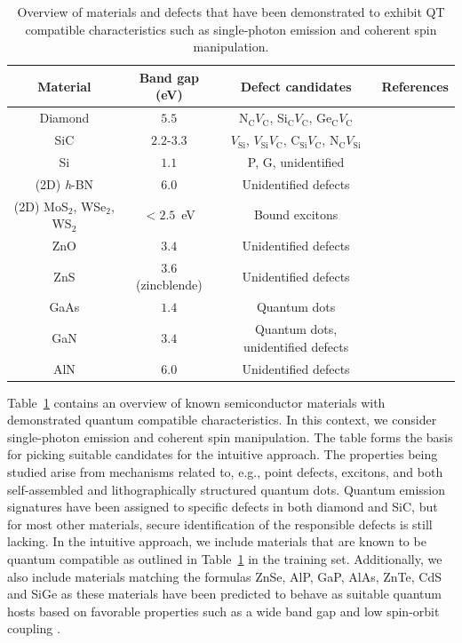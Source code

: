 \documentclass[superscriptaddress,unsortedaddress,
 amsmath,amssymb,
 aps,
]{revtex4-2}
\begin{document}
\begin{table}[b]
    \centering 
    \caption{Overview of materials and defects that have been demonstrated to exhibit QT compatible characteristics such as single-photon emission and coherent spin manipulation.}
    \begin{tabular}{c|c|c|c}
    Material & Band gap (eV) & Defect candidates & References \\
    \hline
    Diamond  & $5.5$  & N$_\mathrm{C}V_\mathrm{C}$, Si$_\mathrm{C}V_\mathrm{C}$, Ge$_\mathrm{C}V_\mathrm{C}$ & \cite{Taylor2008,Balasubramanian_2009,Barclay2011,Gordon2013,Rogers_2014,Bhaskar_2018} \\ 
    SiC & $2.2$-$3.3$ & $V_\mathrm{Si}$, $V_\mathrm{Si}V_\mathrm{C}$, C$_\mathrm{Si}V_\mathrm{C}$, N$_\mathrm{C}V_\mathrm{Si}$ & \cite{Widmann2014,Christle_2015,Castelletto_2014,Zargaleh_2018}  \cite{Weber2010, Son2020, Falk2013} \\ 
    Si & $1.1$ & P, G, unidentified & \cite{Muhonen_2014,Durand_2020,Redjem2020} \\ 
    (2D) \textit{h}-BN & $6.0$ & Unidentified defects & \cite{Tran_2016,Tran_2016b,Hayee_2020} \\ 
    (2D) MoS$_2$, WSe$_2$, WS$_2$ & $<2.5$~eV & Bound excitons & \cite{Toth2019} \\
    ZnO & $3.4$ & Unidentified defects & \cite{Morfa2012} \\ 
    ZnS & $3.6$ (zincblende) & Unidentified defects & \cite{Stewart2019} \\ 
    GaAs & $1.4$ & Quantum dots & \cite{Bluhm2010} \\ 
    GaN & $3.4$ & Quantum dots, unidentified defects & \cite{Roux2017,Berhane2018} \\
    AlN & $6.0$ & Unidentified defects & \cite{Xue2020}\\
    \end{tabular}
    \label{tab:qt-materials}
\end{table} 

Table~\ref{tab:qt-materials} contains an overview of known semiconductor materials with demonstrated quantum compatible characteristics. In this context, we consider single-photon emission and coherent spin manipulation.   
The table forms the basis for picking suitable candidates for the intuitive approach. 
The properties being studied arise from mechanisms related to, e.g., point defects, excitons, and both self-assembled and lithographically structured quantum dots. 
Quantum emission signatures have been assigned to specific defects in both diamond and SiC, but for most other materials, secure identification of the responsible defects is still lacking. 
In the intuitive approach, we include materials that are known to be quantum compatible as outlined in Table~\ref{tab:qt-materials} in the training set. Additionally, we also include materials matching the formulas ZnSe, AlP, GaP, AlAs, ZnTe, CdS and SiGe as these materials have been predicted to behave as suitable quantum hosts based on favorable properties such as a wide band gap and low spin-orbit coupling \cite{Weber2010,Hardy2019}.  
\end{document}
